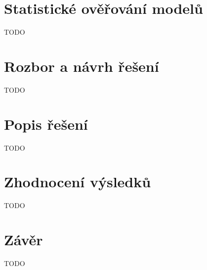 \chapter{Statistické ověřování modelů}
\label{smc}
TODO

\chapter{Rozbor a návrh řešení}
\label{rozbor}
TODO

\chapter{Popis řešení}
\label{popis}
TODO

\chapter{Zhodnocení výsledků} 
\label{zhodnoceni}
TODO

\chapter{Závěr}
\label{zaver}
TODO


%

